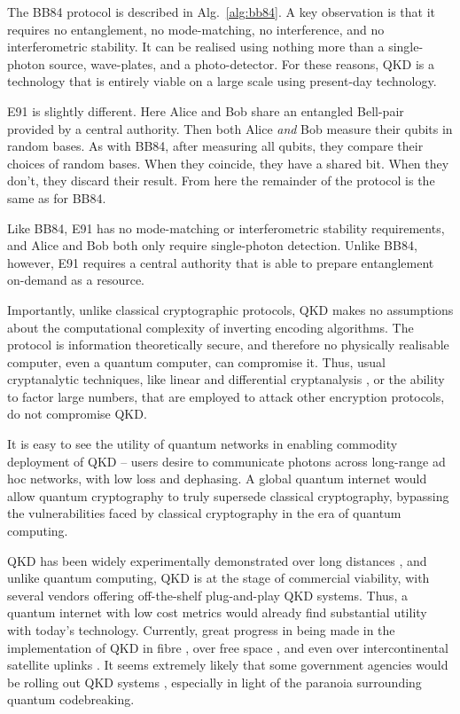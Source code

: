 \documentclass[aps, rmp, twocolumn, amsmath, amssymb, nofootinbib, superscriptaddress, longbibliography, floatfix, table-of-contents, eqsecnum]{revtex4-1}
\begin{document}
The BB84 protocol is described in Alg.~\ref{alg:bb84}. A key observation is that it requires no entanglement, no mode-matching, no interference, and no interferometric stability. It can be realised using nothing more than a single-photon source, wave-plates, and a photo-detector. For these reasons, QKD is a technology that is entirely viable on a large scale using present-day technology.

E91 is slightly different. Here Alice and Bob share an entangled Bell-pair provided by a central authority. Then both Alice \textit{and} Bob measure their qubits in random bases. As with BB84, after measuring all qubits, they compare their choices of random bases. When they coincide, they have a shared bit. When they don't, they discard their result. From here the remainder of the protocol is the same as for BB84.

Like BB84, E91 has no mode-matching or interferometric stability requirements, and Alice and Bob both only require single-photon detection. Unlike BB84, however, E91 requires a central authority that is able to prepare entanglement on-demand as a resource.

Importantly, unlike classical cryptographic protocols, QKD makes no assumptions about the computational complexity of inverting encoding algorithms. The protocol is information theoretically secure, and therefore no physically realisable computer, even a quantum computer, can compromise it. Thus, usual cryptanalytic techniques, like linear and differential cryptanalysis \cite{bib:Schneier96}, or the ability to factor large numbers, that are employed to attack other encryption protocols, do not compromise QKD.

It is easy to see the utility of quantum networks in enabling commodity deployment of QKD -- users desire to communicate photons across long-range ad hoc networks, with low loss and dephasing. A global quantum internet would allow quantum cryptography to truly supersede classical cryptography, bypassing the vulnerabilities faced by classical cryptography in the era of quantum computing.

QKD has been widely experimentally demonstrated over long distances \cite{bib:Muller96}, and unlike quantum computing, QKD is at the stage of commercial viability, with several vendors offering off-the-shelf plug-and-play QKD systems. Thus, a quantum internet with low cost metrics would already find substantial utility with today's technology. Currently, great progress in being made in the implementation of QKD in fibre \cite{???}, over free space \cite{bib:Buttler00}, and even over intercontinental satellite uplinks \cite{JWP}. It seems extremely likely that some government agencies would be rolling out QKD systems \cite{bib:Secret}, especially in light of the paranoia surrounding quantum codebreaking.
\end{document}
